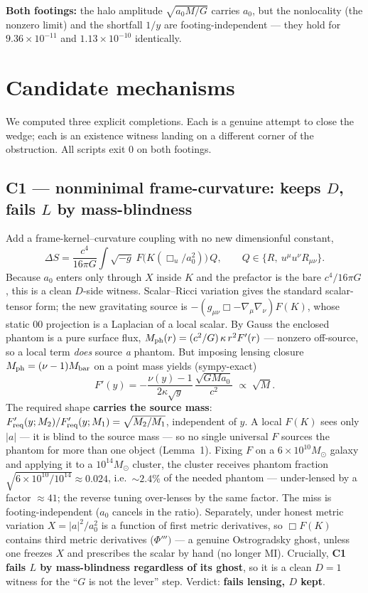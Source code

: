 \documentclass[11pt]{article}
\newcommand{\Boxu}{\Box_u}
\newcommand{\Mph}{M_{\rm ph}}
\begin{document}
\textbf{Both footings:} the halo amplitude $\sqrt{a_0M/G}$ carries $a_0$, but the nonlocality (the nonzero limit) and the shortfall $1/y$ are footing-independent --- they hold for $9.36\times10^{-11}$ and $1.13\times10^{-10}$ identically.

\section{Candidate mechanisms}\label{sec:candidates}

We computed three explicit completions. Each is a genuine attempt to close the wedge; each is an existence witness landing on a different corner of the obstruction. All scripts exit 0 on both footings.

\subsection{C1 --- nonminimal frame-curvature: keeps $D$, fails $L$ by mass-blindness}\label{sec:c1}

Add a frame-kernel--curvature coupling with no new dimensionful constant,
\begin{equation}
\Delta S=\frac{c^4}{16\pi G}\int\sqrt{-g}\;F\!\big(K(\Boxu/a_0^2)\big)\,Q,\qquad Q\in\{R,\ u^\mu u^\nu R_{\mu\nu}\}.
\end{equation}
Because $a_0$ enters only through $X$ inside $K$ and the prefactor is the bare $c^4/16\pi G$, this is a clean $D$-side witness. Scalar--Ricci variation gives the standard scalar-tensor form; the new gravitating source is $-(g_{\mu\nu}\Box-\nabla_\mu\nabla_\nu)F(K)$, whose static $00$ projection is a Laplacian of a local scalar. By Gauss the enclosed phantom is a pure surface flux, $\Mph(r)=(c^2/G)\,\kappa\,r^2F'(r)$ --- nonzero off-source, so a local term \emph{does} source \emph{a} phantom. But imposing lensing closure $\Mph=(\nu-1)M_{\rm bar}$ on a point mass yields (sympy-exact)
\begin{equation}
F'(y)=-\frac{\nu(y)-1}{2\kappa\sqrt y}\,\frac{\sqrt{GMa_0}}{c^2}\;\propto\;\sqrt M.
\end{equation}
The required shape \textbf{carries the source mass}: $F'_{\rm req}(y;M_2)/F'_{\rm req}(y;M_1)=\sqrt{M_2/M_1}$, independent of $y$. A local $F(K)$ sees only $|a|$ --- it is blind to the source mass --- so no single universal $F$ sources the phantom for more than one object (Lemma~1). Fixing $F$ on a $6\times10^{10}M_\odot$ galaxy and applying it to a $10^{14}M_\odot$ cluster, the cluster receives phantom fraction $\sqrt{6\times10^{10}/10^{14}}\approx0.024$, i.e.\ ${\sim}2.4\%$ of the needed phantom --- under-lensed by a factor ${\approx}41$; the reverse tuning over-lenses by the same factor. The miss is footing-independent ($a_0$ cancels in the ratio). Separately, under honest metric variation $X=|a|^2/a_0^2$ is a function of first metric derivatives, so $\Box F(K)$ contains third metric derivatives ($\Phi''')$ --- a genuine Ostrogradsky ghost, unless one freezes $X$ and prescribes the scalar by hand (no longer MI). Crucially, \textbf{C1 fails $L$ by mass-blindness regardless of its ghost}, so it is a clean $D=1$ witness for the ``$G$ is not the lever'' step. Verdict: \textbf{fails lensing, $D$ kept}.
\end{document}
